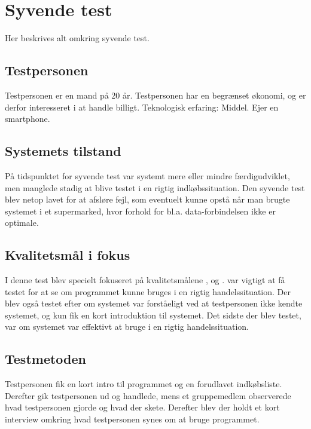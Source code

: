 \section{Syvende test}
Her beskrives alt omkring syvende test.

\subsection{Testpersonen}
Testpersonen er en mand på 20 år. Testpersonen har en begrænset økonomi, og er derfor interesseret i at handle billigt. Teknologisk erfaring: Middel. Ejer en smartphone. 

\subsection{Systemets tilstand}
På tidspunktet for syvende test var systemt mere eller mindre færdigudviklet, men manglede stadig at blive testet i en rigtig indkøbssituation. Den syvende test blev netop lavet for at afsløre fejl, som eventuelt kunne opstå når man brugte systemet i et supermarked, hvor forhold for bl.a. data-forbindelsen ikke er optimale.

\subsection{Kvalitetsmål i fokus}
I denne test blev specielt fokuseret på kvalitetsmålene ,  og .  var vigtigt at få testet for at se om programmet kunne bruges i en rigtig handelssituation. Der blev også testet efter om systemet var forståeligt ved at testpersonen ikke kendte systemet, og kun fik en kort introduktion til systemet. Det sidste der blev testet, var om systemet var effektivt at bruge i en rigtig handelssituation.

\subsection{Testmetoden}
Testpersonen fik en kort intro til programmet og en forudlavet indkøbsliste. Derefter gik testpersonen ud og handlede, mens et gruppemedlem observerede hvad testpersonen gjorde og hvad der skete. Derefter blev der holdt et kort interview omkring hvad testpersonen synes om at bruge programmet.

